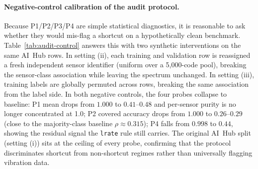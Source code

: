 \documentclass[3p,times,authoryear]{elsarticle}
\theoremstyle{remark}
\begin{document}
\paragraph{Negative-control calibration of the audit
protocol.} Because P1/P2/P3/P4 are simple statistical
diagnostics, it is reasonable to ask whether they would
mis-flag a shortcut on a hypothetically clean benchmark.
Table~\ref{tab:audit-control} answers this with two synthetic
interventions on the same AI~Hub rows. In setting (ii), each
training and validation row is reassigned a fresh independent
sensor identifier (uniform over a 5{,}000-code pool), breaking
the sensor-class association while leaving the spectrum
unchanged. In setting (iii), training labels are globally
permuted across rows, breaking the same association from the
label side. In both negative controls, the four probes
collapse to baseline: P1 mean drops from $1.000$ to
$0.41$--$0.48$ and per-sensor purity is no longer concentrated
at 1.0; P2 covered accuracy drops from $1.000$ to
$0.26$--$0.29$ (close to the majority-class baseline
$\rho \approx 0.315$); P4 falls from $0.998$ to $0.44$,
showing the residual signal the \texttt{lrate} rule still
carries. The original AI~Hub split (setting (i)) sits at the
ceiling of every probe, confirming that the protocol
discriminates shortcut from non-shortcut regimes rather than
universally flagging vibration data.

\begin{table}[!htbp]
\caption{Negative-control calibration of the four-probe audit.
Setting~(i) is the original AI Hub split (positive control);
(ii) replaces \texttt{sid} with a uniformly drawn 5{,}000-code
pool; (iii) globally permutes training labels.
P2 covered accuracy collapses to near the majority-class
baseline ($\rho{=}0.315$) under both negative
controls.\label{tab:audit-control}}
\centering
\scriptsize
\setlength{\tabcolsep}{3pt}
\end{table}
\end{document}
